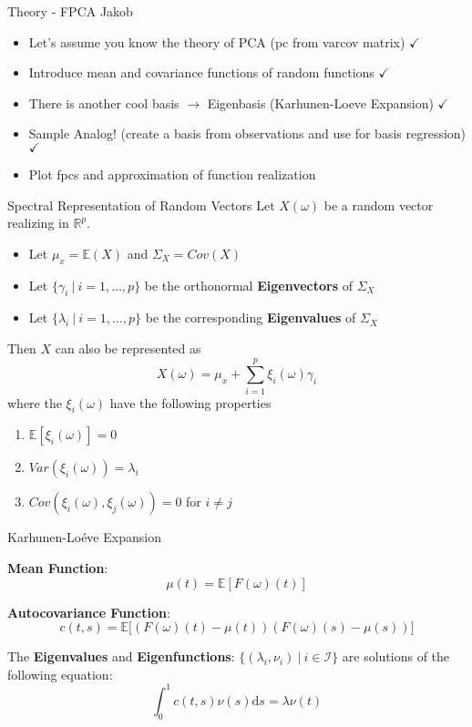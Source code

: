 \documentclass{beamer}
\begin{document}
	\begin{frame}{Theory - FPCA}
		Jakob
		\begin{itemize}
			\item Let's assume you know the theory of PCA (pc from varcov matrix) $\checkmark$
			\item Introduce mean and covariance functions of random functions $\checkmark$
			\item There is another cool basis $\rightarrow$ Eigenbasis (Karhunen-Loeve Expansion) $\checkmark$
			\item Sample Analog! (create a basis from observations and use for basis regression) $\checkmark$
			\item Plot fpcs and approximation of function realization
		\end{itemize}
	\end{frame}

	\begin{frame}{Spectral Representation of Random Vectors}
		Let $X(\omega)$ be a random vector realizing in $\mathbb{R}^p$.

		\begin{itemize}
			\item Let $\mu_x = \mathbb{E}(X)$ and $\Sigma_X = Cov(X)$
			\item Let $\{\gamma_i \: \vert \: i = 1, \dots, p\}$ be the orthonormal \textbf{Eigenvectors} of $\Sigma_X$
			\item Let $\{\lambda_i \: \vert \: i = 1, \dots, p\}$ be the corresponding \textbf{Eigenvalues} of $\Sigma_X$
		\end{itemize}
	
		\vspace{0.2cm}
		Then $X$ can also be represented as
		$$X(\omega) = \mu_x + \sum_{i = 1}^{p} \xi_i(\omega) \gamma_i$$
		where the $\xi_i(\omega)$ have the following properties
		
		\begin{multicols}{2}
			\begin{enumerate}
				\item $\mathbb{E}[\xi_i(\omega)] = 0$
				\item $Var(\xi_i(\omega)) = \lambda_i$
				\item $Cov(\xi_i(\omega), \xi_j(\omega)) = 0$ for $i \neq j$
			\end{enumerate}
		\end{multicols}
	\end{frame}

	\begin{frame}{Karhunen-Lo\'{e}ve Expansion}
		
		\textbf{Mean Function}: $$\mu(t) = \mathbb{E}\left[ F(\omega)(t) \right]$$

		\textbf{Autocovariance Function}: $$c(t,s) = \mathbb{E}\big[ \left( F(\omega)(t) - \mu(t) \right) \left( F(\omega)(s) - \mu(s) \right) \big]$$
		
		The \textbf{Eigenvalues} and \textbf{Eigenfunctions}: $\{(\lambda_i, \nu_i) \: \vert \: i \in \mathcal{I}\}$  are solutions of the following equation:
		$$ \int_{0}^{1}c(t,s)\nu(s) \mathrm{d}s = \lambda \nu(t) $$
	\end{frame}
	
\end{document}
